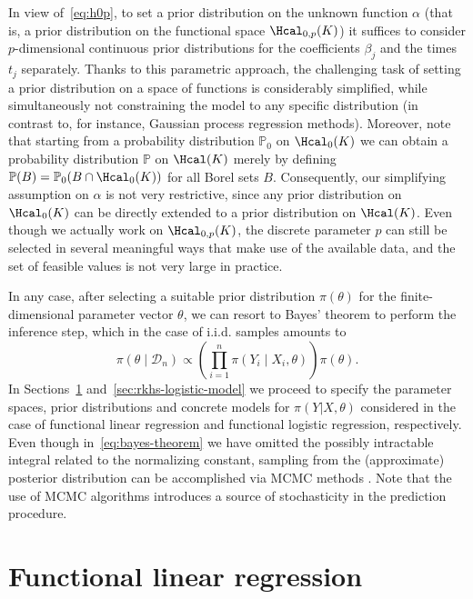 In view of~\eqref{eq:h0p}, to set a prior distribution on the unknown function \(\alpha\) (that is, a prior distribution on the functional space \(\Hcal_{0,p}(K)\)) it suffices to consider \(p\)-dimensional continuous prior distributions for the coefficients \(\beta_j\) and the times \(t_j\) separately. Thanks to this parametric approach, the challenging task of setting a prior distribution on a space of functions is considerably simplified, while simultaneously not constraining the model to any specific distribution (in contrast to, for instance, Gaussian process regression methods). Moreover, note that starting from a probability distribution \(\mathbb{P}_0\) on \(\Hcal_0(K)\) we can obtain a probability distribution \(\mathbb{P}\) on \(\Hcal(K)\) merely by defining \(\mathbb{P}(B) = \mathbb{P}_0(B\cap \Hcal_0(K))\) for all Borel sets \(B\). Consequently, our simplifying assumption on \(\alpha\) is not very restrictive, since any prior distribution on \(\Hcal_0(K)\) can be directly extended to a prior distribution on \(\Hcal(K)\). Even though we actually work on \(\Hcal_{0,p}(K)\), the discrete parameter \(p\) can still be selected in several meaningful ways that make use of the available data, and the set of feasible values is not very large in practice.

In any case, after selecting a suitable prior distribution \(\pi(\theta)\) for the finite-dimensional parameter vector \(\theta\), we can resort to Bayes' theorem to perform the inference step, which in the case of i.i.d. samples amounts to
\begin{equation}\label{eq:bayes-theorem}
  \pi(\theta \mid \mathcal D_n) \propto \left( \prod_{i=1}^n \pi(Y_i\mid X_i, \theta) \right)\pi(\theta).
\end{equation}
In Sections~\ref{sec:rkhs-linear-model} and~\ref{sec:rkhs-logistic-model} we proceed to specify the parameter spaces, prior distributions and concrete models for \(\pi(Y | X,\theta)\) considered in the case of functional linear regression and functional logistic regression, respectively. Even though in~\eqref{eq:bayes-theorem} we have omitted the possibly intractable integral related to the normalizing constant, sampling from the (approximate) posterior distribution can be accomplished via MCMC methods . Note that the use of MCMC algorithms introduces a source of stochasticity in the prediction procedure.

\section{Functional linear regression}\label{sec:rkhs-linear-model}

